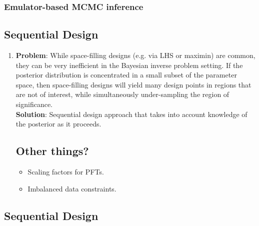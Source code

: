 \documentclass[12pt]{article}
\begin{document}
\subsubsection{Emulator-based MCMC inference}


\subsection{Sequential Design}
\begin{enumerate}
\item \textbf{Problem}: While space-filling designs (e.g. via LHS or maximin) are common, they can be very inefficient in the Bayesian inverse problem setting. If the posterior distribution is concentrated in a small 
subset of the parameter space, then space-filling designs will yield many design points in regions that are not of interest, while simultaneously under-sampling the region of significance.  \\
	\textbf{Solution}: Sequential design approach that takes into account knowledge of the posterior as it proceeds. 
	
\subsection{Other things?}
\begin{itemize}
\item Scaling factors for PFTs. 
\item Imbalanced data constraints. 
\end{itemize}
	
\end{enumerate}

\subsection{Sequential Design}
\end{document}
